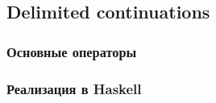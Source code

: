 

\subsection{Delimited continuations}

\cite{dyvbig2007monadic}


\subsubsection{Основные операторы}


\subsubsection{Реализация в Haskell}








































